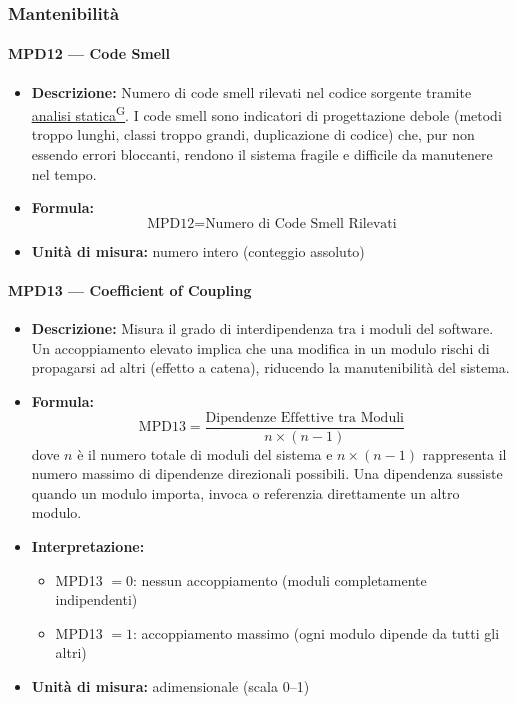 \documentclass[a4paper,12pt]{article}
\providecommand{\glslink}[2]{\href{https://alittlebyte-19.github.io/Documentazione/glossario.html\#gls-#1}{\underline{#2}\textsuperscript{\scriptsize G}}}
\begin{document}
\subsubsection{Mantenibilità}

\paragraph{MPD12 --- Code Smell}
\begin{itemize}
    \item \textbf{Descrizione:} Numero di code smell rilevati nel codice sorgente tramite \glslink{analisi-statica}{analisi statica}. I code smell sono indicatori di progettazione debole (metodi troppo lunghi, classi troppo grandi, duplicazione di codice) che, pur non essendo errori bloccanti, rendono il sistema fragile e difficile da manutenere nel tempo.
    \item \textbf{Formula:}
    $$\text{MPD12} = \text{Numero di Code Smell Rilevati}$$
    \item \textbf{Unità di misura:} numero intero (conteggio assoluto)
\end{itemize}

\paragraph{MPD13 --- Coefficient of Coupling}
\begin{itemize}
    \item \textbf{Descrizione:} Misura il grado di interdipendenza tra i moduli del software. Un accoppiamento elevato implica che una modifica in un modulo rischi di propagarsi ad altri (effetto a catena), riducendo la manutenibilità del sistema.
    \item \textbf{Formula:}
    $$\text{MPD13} = \frac{\text{Dipendenze Effettive tra Moduli}}{n \times (n - 1)}$$
    dove $n$ è il numero totale di moduli del sistema e $n \times (n-1)$ rappresenta il numero massimo di dipendenze direzionali possibili. Una dipendenza sussiste quando un modulo importa, invoca o referenzia direttamente un altro modulo.
    \item \textbf{Interpretazione:}
    \begin{itemize}
        \item MPD13 $= 0$: nessun accoppiamento (moduli completamente indipendenti)
        \item MPD13 $= 1$: accoppiamento massimo (ogni modulo dipende da tutti gli altri)
    \end{itemize}
    \item \textbf{Unità di misura:} adimensionale (scala 0--1)
\end{itemize}
\end{document}
